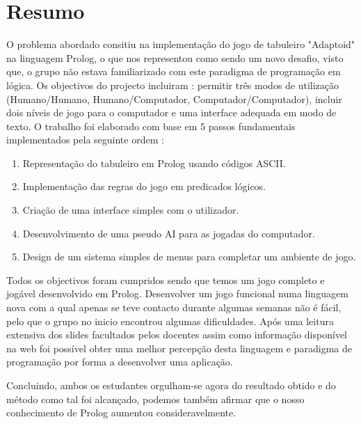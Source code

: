 \documentclass[a4paper]{article}
\begin{document}

\newpage

\section*{Resumo}
O problema abordado consitiu na implementação do jogo de tabuleiro "Adaptoid" na linguagem Prolog, o que nos representou como sendo um novo desafio, visto que, o grupo não estava familiarizado com este paradigma de programação em lógica. Os objectivos do projecto incluiram : permitir três modos de utilização (Humano/Humano, Humano/Computador, Computador/Computador), incluir dois níveis de jogo para o computador e uma interface adequada em modo de texto. O trabalho foi elaborado com base em 5 passos fundamentais implementados pela seguinte ordem :
\begin{enumerate}
    \item Representação do tabuleiro em Prolog usando códigos ASCII.
    \item Implementação das regras do jogo em predicados lógicos.
    \item Criação de uma interface simples com o utilizador.
    \item Desenvolvimento de uma pseudo AI para as jogadas do computador.
    \item Design de um sistema simples de menus para completar um ambiente de jogo.
\end{enumerate}

Todos os objectivos foram cumpridos sendo que temos um jogo completo e jogável desenvolvido em Prolog. Desenvolver um jogo funcional numa linguagem nova com a qual apenas se teve contacto durante algumas semanas não é fácil, pelo que o grupo no inicio encontrou algumas dificuldades. Após uma leitura extensiva dos slides facultados pelos docentes assim como informação disponível na web foi possível obter uma melhor percepção desta linguagem e paradigma de programação por forma a desenvolver uma aplicação.


Concluindo, ambos os estudantes orgulham-se agora do resultado obtido e do método como tal foi alcançado, podemos também afirmar que o nosso conhecimento de Prolog aumentou consideravelmente.
\newpage

\tableofcontents

\end{document}
